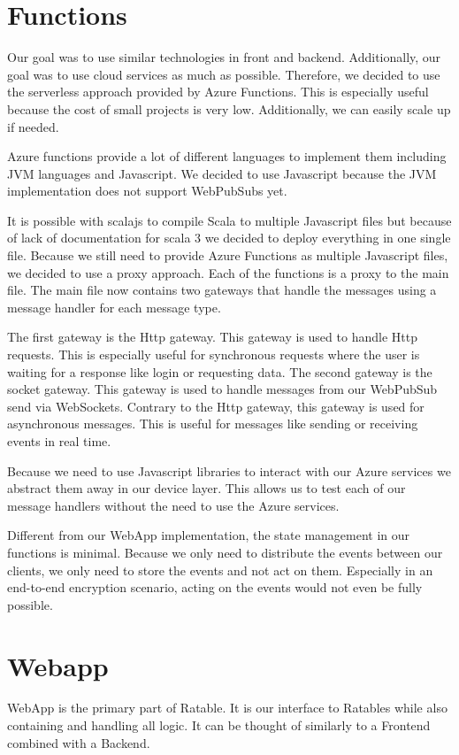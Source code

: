 \documentclass[
	ngerman,
	ruledheaders=section,   %
	class=report,		    %
	thesis={type=bachelor}, %
	accentcolor=9c,			%
	custommargins=false,    %
	marginpar=false,        %
	parskip=half-,          %
	fontsize=11pt,          %
]{tudapub}
\begin{document}


\section{Functions}
Our goal was to use similar technologies in front and backend. Additionally, our goal was to use cloud services as much as possible. Therefore, we decided to use the serverless approach provided by Azure Functions. This is especially useful because the cost of small projects is very low. Additionally, we can easily scale up if needed.

Azure functions provide a lot of different languages to implement them including JVM languages and Javascript. We decided to use Javascript because the JVM implementation does not support WebPubSubs yet.

It is possible with scalajs to compile Scala to multiple Javascript files but because of lack of documentation for scala 3 we decided to deploy everything in one single file. Because we still need to provide Azure Functions as multiple Javascript files, we decided to use a proxy approach. Each of the functions is a proxy to the main file. The main file now contains two gateways that handle the messages using a message handler for each message type.

The first gateway is the Http gateway. This gateway is used to handle Http requests. This is especially useful for synchronous requests where the user is waiting for a response like login or requesting data. The second gateway is the socket gateway. This gateway is used to handle messages from our WebPubSub send via WebSockets. Contrary to the Http gateway, this gateway is used for asynchronous messages. This is useful for messages like sending or receiving events in real time.

Because we need to use Javascript libraries to interact with our Azure services we abstract them away in our device layer. This allows us to test each of our message handlers without the need to use the Azure services. 

Different from our WebApp implementation, the state management in our functions is minimal. Because we only need to distribute the events between our clients, we only need to store the events and not act on them. Especially in an end-to-end encryption scenario, acting on the events would not even be fully possible.

\section{Webapp}
WebApp is the primary part of Ratable. It is our interface to Ratables while also containing and handling all logic. It can be thought of similarly to a Frontend combined with a Backend.
\end{document}

